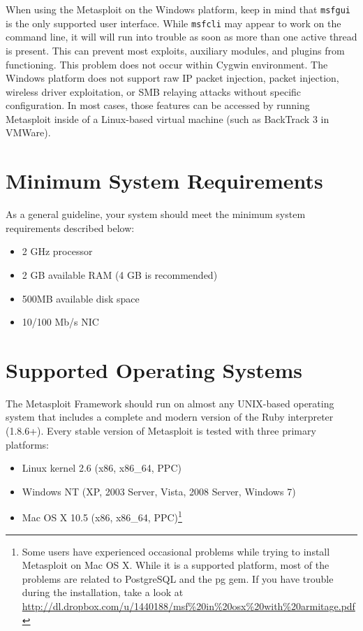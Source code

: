 \documentclass{report}
\begin{document}
\par
When using the Metasploit on the Windows platform, keep in mind that
\texttt{msfgui} is the only supported user interface. While \texttt{msfcli} may
appear to work on the command line, it will will run into trouble as soon as
more than one active thread is present. This can prevent most exploits,
auxiliary modules, and plugins from functioning. This problem does not occur
within Cygwin environment. The Windows platform does not support raw IP packet
injection, packet injection, wireless driver exploitation, or SMB relaying
attacks without specific configuration. In most cases, those features can be
accessed by running Metasploit inside of a Linux-based virtual machine (such as
BackTrack 3 in VMWare).

    \section{Minimum System Requirements}
    \label{INSTALL-REQUIRE}

\par
As a general guideline, your system should meet the minimum system requirements
described below:

\begin{itemize}
\item 2 GHz processor
\item 2 GB available RAM (4 GB is recommended)
\item 500MB available disk space
\item 10/100 Mb/s NIC
\end{itemize}

    \section{Supported Operating Systems}
    \label{INSTALL-SUPPORT}

\par
The Metasploit Framework should run on almost any UNIX-based operating system
that includes a complete and modern version of the Ruby interpreter (1.8.6+).
Every stable version of Metasploit is tested with three primary platforms:

\begin{itemize}
\item Linux kernel 2.6 (x86, x86\_64, PPC)
\item Windows NT (XP, 2003 Server, Vista, 2008 Server, Windows 7)
\item Mac OS X 10.5 (x86, x86\_64, PPC)\footnote{Some users have experienced
      occasional problems while trying to install Metasploit on Mac OS X.
      While it is a supported platform, most of the problems are related to
      PostgreSQL and the pg gem. If you have trouble during the installation,
      take a look at
      \url{http://dl.dropbox.com/u/1440188/msf\%20in\%20osx\%20with\%20armitage.pdf}}
\end{itemize}
\end{document}
